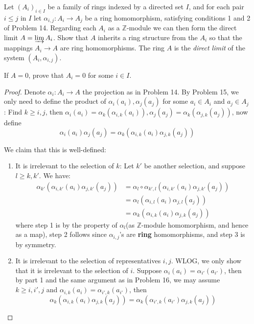 \documentclass{solution}
\begin{document}
\begin{problem}
    Let $(A_i)_{i \in I}$ be a family of rings indexed by a directed set $I$, and for each pair $i \le j$ in $I$ let $\alpha_{i, j}: A_i \rightarrow A_j$ be a ring homomorphism, satisfying conditions 1 and 2 of Problem 14. Regarding each $A_i$ as a $\mathbb{Z}$-module we can then form the direct limit $A = \varinjlim A_i$. Show that $A$ inherits a ring structure from the $A_i$ so that the mappings $A_i \rightarrow A$ are ring homomorphisms. The ring $A$ is the \textit{direct limit} of the system $(A_i, \alpha_{i, j})$.

    If $A = 0$, prove that $A_i = 0$ for some $i \in I$.
\end{problem}

\begin{proof}
    Denote $\alpha_i: A_i \rightarrow A$ the projection as in Problem 14. By Problem 15, we only need to define the product of $\alpha_i(a_i), \alpha_j(a_j)$ for some $a_i \in A_i$ and $a_j \in A_j$: Find $k \ge i, j$, then $\alpha_i(a_i) = \alpha_k(\alpha_{i, k}(a_i)), \alpha_j(a_j) = \alpha_k(\alpha_{j, k}(a_j))$, now define $$\alpha_i(a_i) \alpha_j(a_j) = \alpha_k(\alpha_{i, k}(a_i) \alpha_{j, k}(a_j))$$
    
    We claim that this is well-defined:
    \begin{enumerate}
        \item It is irrelevant to the selection of $k$: Let $k'$ be another selection, and suppose $l \ge k, k'$. We have:
        $$
            \begin{aligned}
            \alpha_{k'}(\alpha_{i, k'}(a_i) \alpha_{j, k'}(a_j))
            &= \alpha_{l} \circ \alpha_{k', l}(\alpha_{i, k'}(a_i) \alpha_{j, k'}(a_j)) \\
            &= \alpha_l (\alpha_{i, l}(a_i) \alpha_{j, l}(a_j)) \\
            &= \alpha_{k}(\alpha_{i, k}(a_i) \alpha_{j, k}(a_j))
            \end{aligned}
        $$
        where step 1 is by the property of $\alpha_l$(as $\mathbb{Z}$-module homomorphism, and hence as a map), step 2 follows since $\alpha_{i, j}$'s are \textbf{ring} homomorphisms, and step 3 is by symmetry.
        \item It is irrelevant to the selection of representatives $i, j$. WLOG, we only show that it is irrelevant to the selection of $i$. Suppose $\alpha_{i}(a_i) = \alpha_{i'}(a_{i'})$, then by part 1 and the same argument as in Problem 16, we may assume $k \ge i, i', j$ and $\alpha_{i, k}(a_i) = \alpha_{i', k}(a_{i'})$, then
        $$\alpha_{k}(\alpha_{i, k}(a_i) \alpha_{j, k}(a_j)) = \alpha_{k}(\alpha_{i', k}(a_{i'})\alpha_{j, k}(a_j))$$
    \end{enumerate}


\end{proof}
\end{document}
